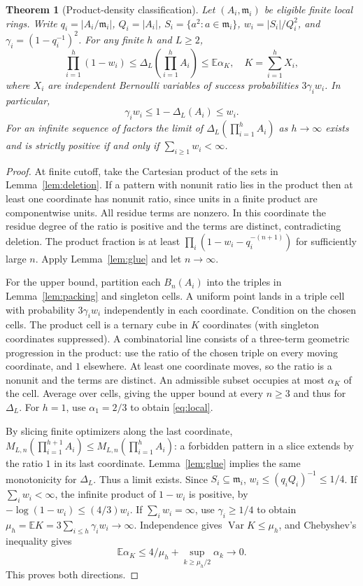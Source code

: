 \documentclass[11pt]{article}
\newtheorem{theorem}{Theorem}[section]
\theoremstyle{remark}\newtheorem{remark}[theorem]{Remark}
\newcommand{\m}{\mathfrak m}
\newcommand{\E}{\mathbb E}
\begin{document}
\begin{theorem}[Product-density classification]\label{thm:main}
Let $(A_i,\m_i)$ be eligible finite local rings. Write $q_i=|A_i/\m_i|$, $Q_i=|A_i|$, $S_i=\{a^2:a\in\m_i\}$, $w_i=|S_i|/Q_i^2$, and $\gamma_i=(1-q_i^{-1})^2$. For any finite $h$ and $L\ge2$,
\begin{equation}\label{eq:product}
 \prod_{i=1}^h(1-w_i)\le \Delta_L\left(\prod_{i=1}^h A_i\right)
 \le \E\alpha_K,\quad K=\sum_{i=1}^h X_i,
\end{equation}
where $X_i$ are independent Bernoulli variables of success probabilities $3\gamma_i w_i$. In particular,
\begin{equation}\label{eq:local}
 \gamma_i w_i\le 1-\Delta_L(A_i)\le w_i.
\end{equation}
For an infinite sequence of factors the limit of $\Delta_L(\prod_{i=1}^h A_i)$ as $h\to\infty$ exists and is strictly positive if and only if $\sum_{i\ge1}w_i<\infty$.
\end{theorem}
\begin{proof}
At finite cutoff, take the Cartesian product of the sets in Lemma~\ref{lem:deletion}. If a pattern with nonunit ratio lies in the product then at least one coordinate has nonunit ratio, since units in a finite product are componentwise units. All residue terms are nonzero. In this coordinate the residue degree of the ratio is positive and the terms are distinct, contradicting deletion. The product fraction is at least $\prod_i(1-w_i-q_i^{-(n+1)})$ for sufficiently large $n$. Apply Lemma~\ref{lem:glue} and let $n\to\infty$.

For the upper bound, partition each $B_n(A_i)$ into the triples in Lemma~\ref{lem:packing} and singleton cells. A uniform point lands in a triple cell with probability $3\gamma_iw_i$ independently in each coordinate. Condition on the chosen cells. The product cell is a ternary cube in $K$ coordinates (with singleton coordinates suppressed). A combinatorial line consists of a three-term geometric progression in the product: use the ratio of the chosen triple on every moving coordinate, and $1$ elsewhere. At least one coordinate moves, so the ratio is a nonunit and the terms are distinct. An admissible subset occupies at most $\alpha_K$ of the cell. Average over cells, giving the upper bound at every $n\ge3$ and thus for $\Delta_L$. For $h=1$, use $\alpha_1=2/3$ to obtain \eqref{eq:local}.

By slicing finite optimizers along the last coordinate, $M_{L,n}(\prod_{i=1}^{h+1} A_i)\le M_{L,n}(\prod_{i=1}^h A_i)$: a forbidden pattern in a slice extends by the ratio $1$ in its last coordinate. Lemma~\ref{lem:glue} implies the same monotonicity for $\Delta_L$. Thus a limit exists. Since $S_i\subseteq\m_i$, $w_i\le (q_iQ_i)^{-1}\le1/4$. If $\sum_i w_i<\infty$, the infinite product of $1-w_i$ is positive, by $-\log(1-w_i)\le(4/3)w_i$. If $\sum_i w_i=\infty$, use $\gamma_i\ge1/4$ to obtain $\mu_h=\E K=3\sum_{i\le h}\gamma_iw_i\to\infty$. Independence gives $\operatorname{Var}K\le\mu_h$, and Chebyshev's inequality gives
\[
 \E\alpha_K\le 4/\mu_h+\sup_{k\ge\mu_h/2}\alpha_k\longrightarrow0.
\]
This proves both directions.
\end{proof}
\end{document}
